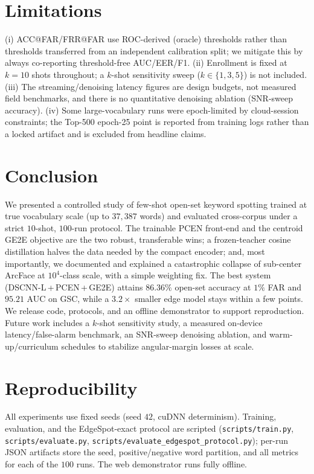 \documentclass[10pt,twocolumn]{article}
\newcommand{\code}[1]{\texttt{\small #1}}
\begin{document}
\section{Limitations}\label{sec:limits}

(i) ACC@FAR/FRR@FAR use ROC-derived (oracle) thresholds rather than thresholds
transferred from an independent calibration split; we mitigate this by always
co-reporting threshold-free AUC/EER/F1. (ii) Enrollment is fixed at $k{=}10$
shots throughout; a $k$-shot sensitivity sweep ($k{\in}\{1,3,5\}$) is not
included. (iii) The streaming/denoising latency figures are design budgets, not
measured field benchmarks, and there is no quantitative denoising ablation
(SNR-sweep accuracy). (iv) Some large-vocabulary runs were epoch-limited by
cloud-session constraints; the Top-500 epoch-25 point is reported from training
logs rather than a locked artifact and is excluded from headline claims.

\section{Conclusion}\label{sec:conclusion}

We presented a controlled study of few-shot open-set keyword spotting trained at
true vocabulary scale (up to $37{,}387$ words) and evaluated cross-corpus under a
strict $10$-shot, $100$-run protocol. The trainable PCEN front-end and the
centroid GE2E objective are the two robust, transferable wins; a frozen-teacher
cosine distillation halves the data needed by the compact encoder; and, most
importantly, we documented and explained a catastrophic collapse of sub-center
ArcFace at $10^4$-class scale, with a simple weighting fix. The best system
(DSCNN-L\,+\,PCEN\,+\,GE2E) attains $86.36\%$ open-set accuracy at $1\%$ FAR and
$95.21$ AUC on GSC, while a $3.2\times$ smaller edge model stays within a few
points. We release code, protocols, and an offline demonstrator to support
reproduction. Future work includes a $k$-shot sensitivity study, a measured
on-device latency/false-alarm benchmark, an SNR-sweep denoising ablation, and
warm-up/curriculum schedules to stabilize angular-margin losses at scale.

\section*{Reproducibility}
All experiments use fixed seeds (seed $42$, cuDNN determinism). Training,
evaluation, and the EdgeSpot-exact protocol are scripted
(\code{scripts/train.py}, \code{scripts/evaluate.py},
\code{scripts/evaluate\_edgespot\_protocol.py}); per-run JSON artifacts store the
seed, positive/negative word partition, and all metrics for each of the $100$
runs. The web demonstrator runs fully offline.
\end{document}
